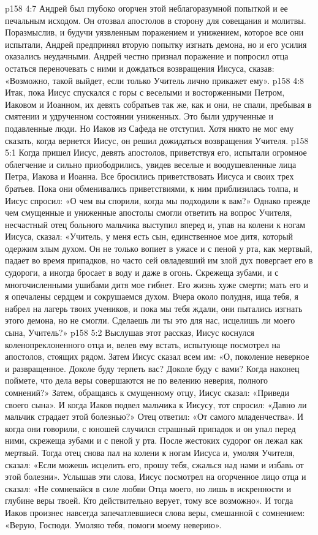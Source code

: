 \vs p158 4:7 Андрей был глубоко огорчен этой неблагоразумной попыткой и ее печальным исходом. Он отозвал апостолов в сторону для совещания и молитвы. Поразмыслив, и будучи уязвленным поражением и унижением, которое все они испытали, Андрей предпринял вторую попытку изгнать демона, но и его усилия оказались неудачными. Андрей честно признал поражение и попросил отца остаться переночевать с ними и дождаться возвращения Иисуса, сказав: «Возможно, такой выйдет, если только Учитель лично прикажет ему».
\vs p158 4:8 Итак, пока Иисус спускался с горы с веселыми и восторженными Петром, Иаковом и Иоанном, их девять собратьев так же, как и они, не спали, пребывая в смятении и удрученном состоянии униженных. Это были удрученные и подавленные люди. Но Иаков из Сафеда не отступил. Хотя никто не мог ему сказать, когда вернется Иисус, он решил дожидаться возвращения Учителя.
\vs p158 5:1 Когда пришел Иисус, девять апостолов, приветствуя его, испытали огромное облегчение и сильно приободрились, увидев веселые и воодушевленные лица Петра, Иакова и Иоанна. Все бросились приветствовать Иисуса и своих трех братьев. Пока они обменивались приветствиями, к ним приблизилась толпа, и Иисус спросил: «О чем вы спорили, когда мы подходили к вам?» Однако прежде чем смущенные и униженные апостолы смогли ответить на вопрос Учителя, несчастный отец больного мальчика выступил вперед и, упав на колени к ногам Иисуса, сказал: «Учитель, у меня есть сын, единственное мое дитя, который одержим злым духом. Он не только вопиет в ужасе и с пеной у рта, как мертвый, падает во время припадков, но часто сей овладевший им злой дух повергает его в судороги, а иногда бросает в воду и даже в огонь. Скрежеща зубами, и с многочисленными ушибами дитя мое гибнет. Его жизнь хуже смерти; мать его и я опечалены сердцем и сокрушаемся духом. Вчера около полудня, ища тебя, я набрел на лагерь твоих учеников, и пока мы тебя ждали, они пытались изгнать этого демона, но не смогли. Сделаешь ли ты это для нас, исцелишь ли моего сына, Учитель?»
\vs p158 5:2 Выслушав этот рассказ, Иисус коснулся коленопреклоненного отца и, велев ему встать, испытующе посмотрел на апостолов, стоящих рядом. Затем Иисус сказал всем им: «О, поколение неверное и развращенное. Доколе буду терпеть вас? Доколе буду с вами? Когда наконец поймете, что дела веры совершаются не по велению неверия, полного сомнений?» Затем, обращаясь к смущенному отцу, Иисус сказал: «Приведи своего сына». И когда Иаков подвел мальчика к Иисусу, тот спросил: «Давно ли мальчик страдает этой болезнью?» Отец ответил: «От самого младенчества». И когда они говорили, с юношей случился страшный припадок и он упал перед ними, скрежеща зубами и с пеной у рта. После жестоких судорог он лежал как мертвый. Тогда отец снова пал на колени к ногам Иисуса и, умоляя Учителя, сказал: «Если можешь исцелить его, прошу тебя, сжалься над нами и избавь от этой болезни». Услышав эти слова, Иисус посмотрел на огорченное лицо отца и сказал: «Не сомневайся в силе любви Отца моего, но лишь в искренности и глубине веры твоей. Кто действительно верует, тому все возможно». И тогда Иаков произнес навсегда запечатлевшиеся слова веры, смешанной с сомнением: «Верую, Господи. Умоляю тебя, помоги моему неверию».
